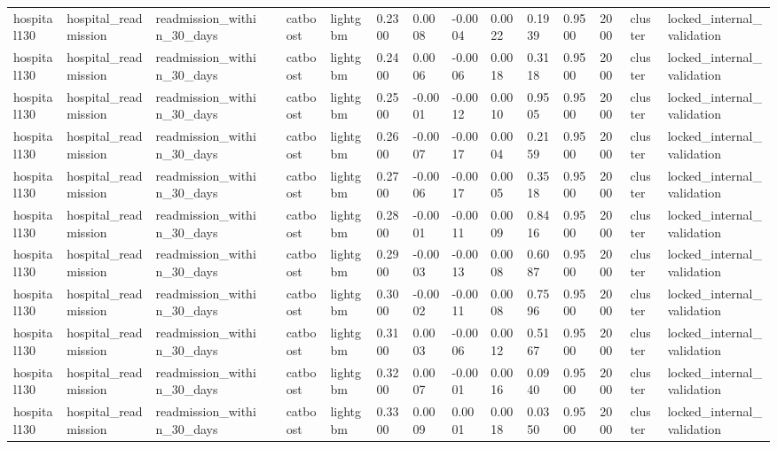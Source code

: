 \begin{tabular}{lllllllllllllll}
hospital130 & hospital\_readmission & readmission\_within\_30\_days &  & catboost & lightgbm & 0.2300 & 0.0008 & -0.0004 & 0.0022 & 0.1939 & 0.9500 & 2000 & cluster & locked\_internal\_validation \\
hospital130 & hospital\_readmission & readmission\_within\_30\_days &  & catboost & lightgbm & 0.2400 & 0.0006 & -0.0006 & 0.0018 & 0.3118 & 0.9500 & 2000 & cluster & locked\_internal\_validation \\
hospital130 & hospital\_readmission & readmission\_within\_30\_days &  & catboost & lightgbm & 0.2500 & -0.0001 & -0.0012 & 0.0010 & 0.9505 & 0.9500 & 2000 & cluster & locked\_internal\_validation \\
hospital130 & hospital\_readmission & readmission\_within\_30\_days &  & catboost & lightgbm & 0.2600 & -0.0007 & -0.0017 & 0.0004 & 0.2159 & 0.9500 & 2000 & cluster & locked\_internal\_validation \\
hospital130 & hospital\_readmission & readmission\_within\_30\_days &  & catboost & lightgbm & 0.2700 & -0.0006 & -0.0017 & 0.0005 & 0.3518 & 0.9500 & 2000 & cluster & locked\_internal\_validation \\
hospital130 & hospital\_readmission & readmission\_within\_30\_days &  & catboost & lightgbm & 0.2800 & -0.0001 & -0.0011 & 0.0009 & 0.8416 & 0.9500 & 2000 & cluster & locked\_internal\_validation \\
hospital130 & hospital\_readmission & readmission\_within\_30\_days &  & catboost & lightgbm & 0.2900 & -0.0003 & -0.0013 & 0.0008 & 0.6087 & 0.9500 & 2000 & cluster & locked\_internal\_validation \\
hospital130 & hospital\_readmission & readmission\_within\_30\_days &  & catboost & lightgbm & 0.3000 & -0.0002 & -0.0011 & 0.0008 & 0.7596 & 0.9500 & 2000 & cluster & locked\_internal\_validation \\
hospital130 & hospital\_readmission & readmission\_within\_30\_days &  & catboost & lightgbm & 0.3100 & 0.0003 & -0.0006 & 0.0012 & 0.5167 & 0.9500 & 2000 & cluster & locked\_internal\_validation \\
hospital130 & hospital\_readmission & readmission\_within\_30\_days &  & catboost & lightgbm & 0.3200 & 0.0007 & -0.0001 & 0.0016 & 0.0940 & 0.9500 & 2000 & cluster & locked\_internal\_validation \\
hospital130 & hospital\_readmission & readmission\_within\_30\_days &  & catboost & lightgbm & 0.3300 & 0.0009 & 0.0001 & 0.0018 & 0.0350 & 0.9500 & 2000 & cluster & locked\_internal\_validation \\

\end{tabular}
